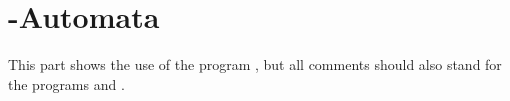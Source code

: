 
\newpage
\section{\Z-Automata}
\label{sec:vcsn-char-z}

This part shows the use of the program , but
all comments should also stand for the programs
 and .


